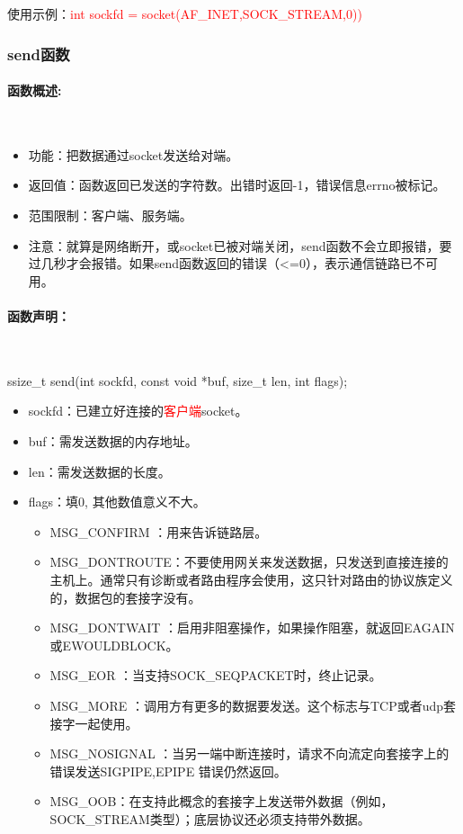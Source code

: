 \documentclass[UTF8]{article}%
\begin{document}
使用示例：\textcolor{red}{int sockfd = socket(AF\_INET,SOCK\_STREAM,0))}

\subsubsection{send函数}

\paragraph{函数概述:}~{}

\begin{itemize}
    \item 功能：把数据通过socket发送给对端。
    \item 返回值：函数返回已发送的字符数。出错时返回-1，错误信息errno被标记。
    \item 范围限制：客户端、服务端。
    \item 注意：就算是网络断开，或socket已被对端关闭，send函数不会立即报错，要过几秒才会报错。如果send函数返回的错误（<=0），表示通信链路已不可用。
\end{itemize}

\paragraph{函数声明：}~{}

ssize\_t send(int sockfd, const void *buf, size\_t len, int flags);

\begin{itemize}
    \item sockfd：已建立好连接的\textcolor{red}{客户端}socket。
    \item buf：需发送数据的内存地址。
    \item len：需发送数据的长度。
    \item flags：填0, 其他数值意义不大。
    {
        \begin{itemize}
        \item MSG\_CONFIRM ：用来告诉链路层。
        \item MSG\_DONTROUTE：不要使用网关来发送数据，只发送到直接连接的主机上。通常只有诊断或者路由程序会使用，这只针对路由的协议族定义的，数据包的套接字没有。
        \item MSG\_DONTWAIT ：启用非阻塞操作，如果操作阻塞，就返回EAGAIN或EWOULDBLOCK。
        \item MSG\_EOR ：当支持SOCK\_SEQPACKET时，终止记录。
        \item MSG\_MORE ：调用方有更多的数据要发送。这个标志与TCP或者udp套接字一起使用。
        \item MSG\_NOSIGNAL ：当另一端中断连接时，请求不向流定向套接字上的错误发送SIGPIPE,EPIPE 错误仍然返回。
        \item MSG\_OOB：在支持此概念的套接字上发送带外数据（例如，SOCK\_STREAM类型）；底层协议还必须支持带外数据。
    \end{itemize}

    }
\end{itemize}
\end{document}
